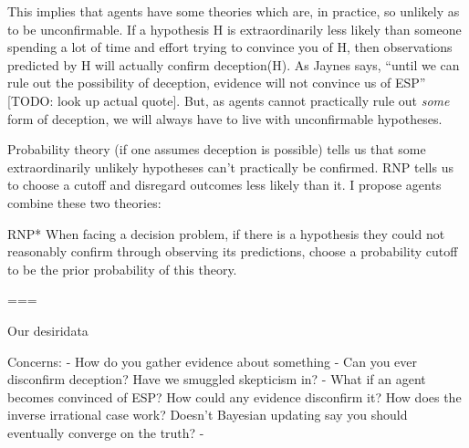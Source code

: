 This implies that agents have some theories which are, in practice, so unlikely as to be unconfirmable. If a hypothesis H is extraordinarily less likely than someone spending a lot of time and effort trying to convince you of H, then observations predicted by H will actually confirm deception(H). As Jaynes says, ``until we can rule out the possibility of deception, evidence will not convince us of ESP'' [TODO: look up actual quote]. But, as agents cannot practically rule out \textit{some} form of deception, we will always have to live with unconfirmable hypotheses.

Probability theory (if one assumes deception is possible) tells us that some extraordinarily unlikely hypotheses can't practically be confirmed. RNP tells us to choose a cutoff and disregard outcomes less likely than it. I propose agents combine these two theories:

RNP* When facing a decision problem, if there is a hypothesis they could not reasonably confirm through observing its predictions, choose a probability cutoff \epsilon to be the prior probability of this theory.

=== 

Our desiridata

Concerns:
 - How do you gather evidence about something
 - Can you ever disconfirm deception? Have we smuggled skepticism in?
 - What if an agent becomes convinced of ESP? How could any evidence disconfirm it? How does the inverse irrational case work? Doesn't Bayesian updating say you should eventually converge on the truth?
 - 